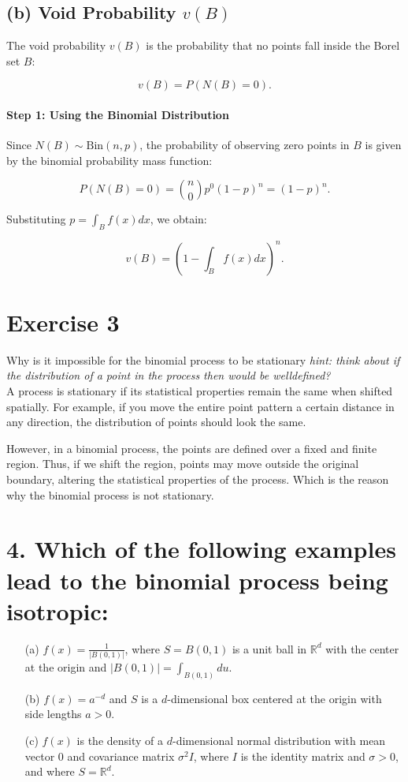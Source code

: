 \documentclass{article}
\begin{document}
\subsection*{(b) Void Probability $v(B)$}

The void probability $v(B)$ is the probability that no points fall inside the Borel set $B$:

\[
    v(B) = P(N(B) = 0).
\]

\paragraph{Step 1: Using the Binomial Distribution}
Since $N(B) \sim \text{Bin}(n, p)$, the probability of observing zero points in $B$ is given by the binomial probability mass function:

\[
    P(N(B) = 0) = \binom{n}{0} p^0 (1 - p)^n = (1 - p)^n.
\]

Substituting $p = \int_B f(x) dx$, we obtain:

\[
    v(B) = \left( 1 - \int_B f(x) dx \right)^n.
\]

\section*{Exercise 3}
Why is it impossible for the binomial process to be stationary \textit{hint: think
about if the distribution of a point in the process then would be welldefined?}\\

A process is stationary if its statistical properties remain the same when shifted spatially. 
For example, if you move the entire point pattern a certain distance in any direction, 
the distribution of points should look the same.

However, in a binomial process, the points are defined over a fixed and finite region. 
Thus, if we shift the region, points may move outside the original boundary, altering the statistical properties of the process. 
Which is the reason why the binomial process is not stationary.
\section*{4. Which of the following examples lead to the binomial process being isotropic:}
\begin{enumerate}
    \item[(a)] $f(x) = \frac{1}{|B(0, 1)|}$, where $S = B(0, 1)$ is a unit ball in $\mathbb{R}^d$ with the center at the origin and $|B(0, 1)| = \int_{B(0,1)} du$.
    
    \item[(b)] $f(x) = a^{-d}$ and $S$ is a $d$-dimensional box centered at the origin with side lengths $a > 0$.
    
    \item[(c)] $f(x)$ is the density of a $d$-dimensional normal distribution with mean vector 0 and covariance matrix $\sigma^2 I$, where $I$ is the identity matrix and $\sigma > 0$, and where $S = \mathbb{R}^d$.
\end{enumerate}
\end{document}
